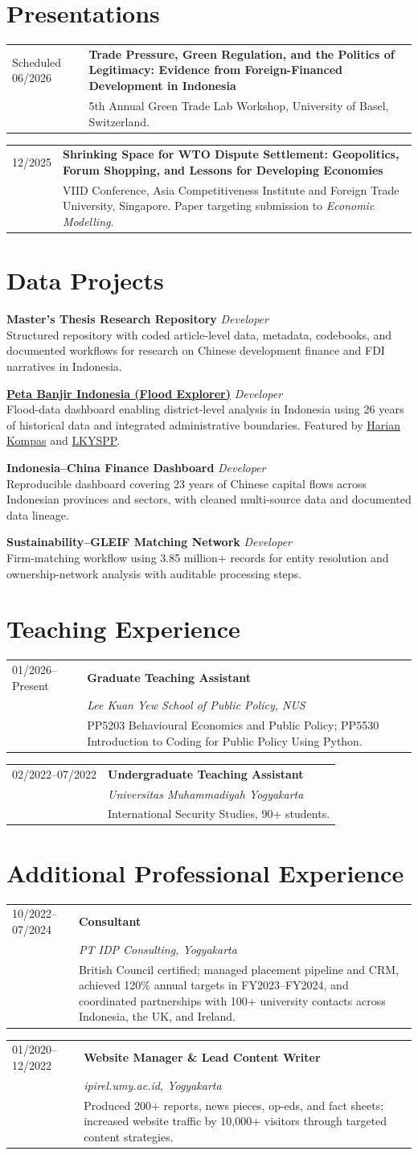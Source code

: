\documentclass[10pt,a4paper]{article}
\makeatletter
\newcommand{\cvsection}[1]{\section*{#1}}
\newcommand{\entry}[4]{%
  \begin{tabularx}{\textwidth}{@{}p{0.17\textwidth}X@{}}
    \textcolor{muted}{#1} & \textbf{#2}\\
    & \textit{#3}\\
    & #4
  \end{tabularx}\vspace{5pt}
}
\newcommand{\simpleentry}[3]{%
  \begin{tabularx}{\textwidth}{@{}p{0.17\textwidth}X@{}}
    \textcolor{muted}{#1} & \textbf{#2}\\
    & #3
  \end{tabularx}\vspace{4pt}
}
\newcommand{\project}[2]{%
  \textbf{#1} \textbar{} \textit{Developer}\\
  #2\par\vspace{5pt}
}
\makeatother
\begin{document}
\cvsection{Presentations}
\simpleentry{Scheduled 06/2026}{Trade Pressure, Green Regulation, and the Politics of Legitimacy: Evidence from Foreign-Financed Development in Indonesia}{5th Annual Green Trade Lab Workshop, University of Basel, Switzerland.}
\simpleentry{12/2025}{Shrinking Space for WTO Dispute Settlement: Geopolitics, Forum Shopping, and Lessons for Developing Economies}{VIID Conference, Asia Competitiveness Institute and Foreign Trade University, Singapore. Paper targeting submission to \textit{Economic Modelling}.}

\cvsection{Data Projects}
\project{Master's Thesis Research Repository}{Structured repository with coded article-level data, metadata, codebooks, and documented workflows for research on Chinese development finance and FDI narratives in Indonesia.}
\project{\href{https://flood.faizkrisnadi.com}{Peta Banjir Indonesia (Flood Explorer)}}{Flood-data dashboard enabling district-level analysis in Indonesia using 26 years of historical data and integrated administrative boundaries. Featured by \href{https://www.kompas.id/artikel/mengolah-jutaan-data-untuk-menguatkan-sistem-mitigasi-banjir-dengan-ai}{Harian Kompas} and \href{https://lkyspp.nus.edu.sg/news-events/news/details/beyond-the-classroom--faiz-krisnadi-s-tech-based-solutions-for-flooding-and-caregiving-policy}{LKYSPP}.}
\project{Indonesia--China Finance Dashboard}{Reproducible dashboard covering 23 years of Chinese capital flows across Indonesian provinces and sectors, with cleaned multi-source data and documented data lineage.}
\project{Sustainability--GLEIF Matching Network}{Firm-matching workflow using 3.85 million+ records for entity resolution and ownership-network analysis with auditable processing steps.}

\cvsection{Teaching Experience}
\entry{01/2026--Present}{Graduate Teaching Assistant}{Lee Kuan Yew School of Public Policy, NUS}{PP5203 Behavioural Economics and Public Policy; PP5530 Introduction to Coding for Public Policy Using Python.}
\entry{02/2022--07/2022}{Undergraduate Teaching Assistant}{Universitas Muhammadiyah Yogyakarta}{International Security Studies, 90+ students.}

\cvsection{Additional Professional Experience}
\entry{10/2022--07/2024}{Consultant}{PT IDP Consulting, Yogyakarta}{British Council certified; managed placement pipeline and CRM, achieved 120\% annual targets in FY2023--FY2024, and coordinated partnerships with 100+ university contacts across Indonesia, the UK, and Ireland.}
\entry{01/2020--12/2022}{Website Manager \& Lead Content Writer}{ipirel.umy.ac.id, Yogyakarta}{Produced 200+ reports, news pieces, op-eds, and fact sheets; increased website traffic by 10,000+ visitors through targeted content strategies.}
\end{document}
